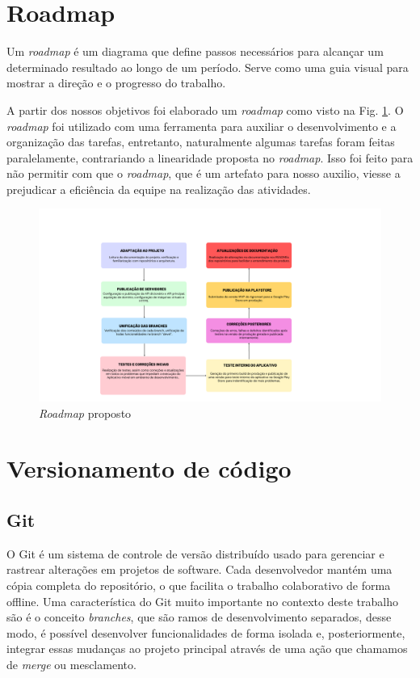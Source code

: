 \section{Roadmap}
Um \textit{roadmap} é um diagrama que define passos necessários para alcançar um determinado resultado ao longo de um período. Serve como uma guia visual para mostrar a direção e o progresso do trabalho.

A partir dos nossos objetivos foi elaborado um \textit{roadmap} como visto na Fig. \ref{roadmap}. O \textit{roadmap} foi utilizado com uma ferramenta para auxiliar o desenvolvimento e a organização das tarefas, entretanto, naturalmente algumas tarefas foram feitas paralelamente, contrariando a linearidade proposta no \textit{roadmap}. Isso foi feito para não permitir com que o \textit{roadmap}, que é um artefato para nosso auxilio, viesse a prejudicar a eficiência da equipe na realização das atividades.

\begin{figure}[h]
	\centering
	\includegraphics[keepaspectratio=true,scale=0.3]{figuras/roadmap2.png}
	\caption{\textit{Roadmap} proposto}
	\label{roadmap}
\end{figure}


\section{Versionamento de código}

\subsection{Git}
O Git é um sistema de controle de versão distribuído usado para gerenciar e rastrear alterações em projetos de software. Cada desenvolvedor mantém uma cópia completa do repositório, o que facilita o trabalho colaborativo de forma offline. Uma característica do Git muito importante no contexto deste trabalho são é o conceito \textit{branches}, que são ramos de desenvolvimento separados, desse modo, é possível desenvolver funcionalidades de forma isolada e, posteriormente, integrar essas mudanças ao projeto principal através de uma ação que chamamos de \textit{merge} ou mesclamento.

